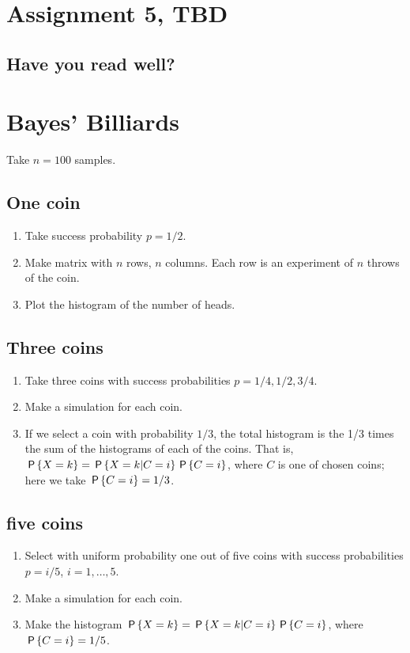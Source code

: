 \documentclass[assignments]{subfiles}
\begin{document}
\section{Assignment 5, TBD}

\subsection{Have you read well?}

\section{Bayes' Billiards}
\label{sec:orgf93559e}
Take \(n=100\) samples.

\subsection{One coin}
\label{sec:org1e9a031}
\begin{enumerate}
\item Take success probability \(p=1/2\).
\item Make matrix with \(n\) rows, \(n\) columns. Each row is an experiment of \(n\) throws of the coin.
\item Plot the histogram of the number of heads.
\end{enumerate}

\subsection{Three coins}
\label{sec:orga657159}
\begin{enumerate}
\item Take three coins with success probabilities \(p=1/4, 1/2, 3/4\).
\item Make a simulation for each coin.
\item If we select a coin with probability \(1/3\), the total histogram is the 1/3 times the sum of the histograms of each of the coins. That is, \(\P{X=k} = \P{X=k|C = i}\P{C=i}\), where \(C\) is one of chosen coins;  here we take \(\P{C=i} = 1/3\).
\end{enumerate}

\subsection{five coins}
\label{sec:orga1a3b28}
\begin{enumerate}
\item Select with uniform probability one out of five coins with success probabilities \(p=i/5\),  \(i=1,\ldots, 5\).
\item Make a simulation for each coin.
\item Make the histogram \(\P{X=k} = \P{X=k|C = i}\P{C=i}\), where \(\P{C=i} = 1/5\).
\end{enumerate}
\end{document}
